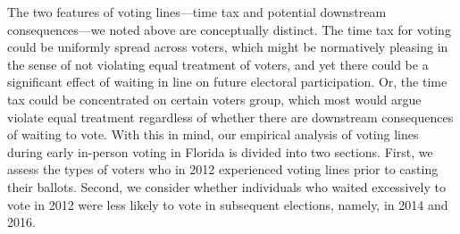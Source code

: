 \documentclass[12pt,titlepage]{article}
\begin{document}



The two features of voting lines---time tax and potential downstream
consequences---we noted above are conceptually distinct. The time tax
for voting could be uniformly spread across voters, which might be
normatively pleasing in the sense of not violating equal treatment of
voters, and yet there could be a significant effect of waiting in line
on future electoral participation. Or, the time tax could be
concentrated on certain voters group, which most would argue violate
equal treatment regardless of whether there are downstream
consequences of waiting to vote. With this in mind, our empirical
analysis of voting lines during early in-person voting in Florida is
divided into two sections. First, we assess the types of voters who in
2012 experienced voting lines prior to casting their ballots. Second,
we consider whether individuals who waited excessively to vote in 2012
were less likely to vote in subsequent elections, namely, in 2014 and
2016.

\end{document}
